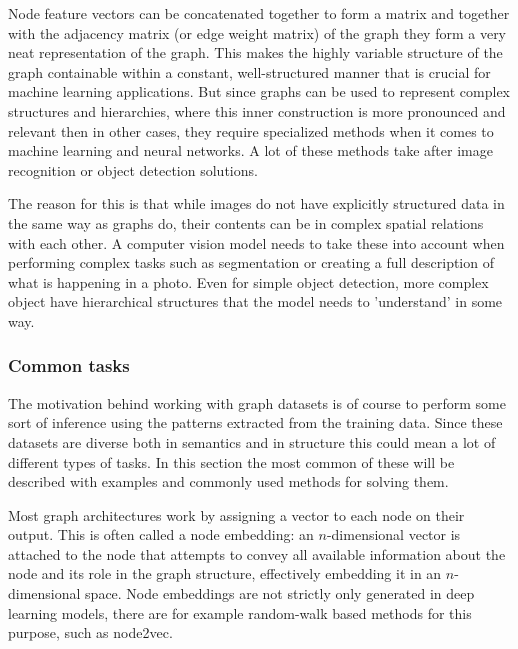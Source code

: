 	Node feature vectors can be concatenated together to form a matrix and together with the adjacency matrix (or edge weight matrix) of the graph they form a very neat representation of the graph. This makes the highly variable structure of the graph containable within a constant, well-structured manner that is crucial for machine learning applications. But since graphs can be used to represent complex structures and hierarchies, where this inner construction is more pronounced and relevant then in other cases, they require specialized methods when it comes to machine learning and neural networks. A lot of these methods take after image recognition or object detection solutions\cite{zhang2019graph}.
	
	The reason for this is that while images do not have explicitly structured data in the same way as graphs do, their contents can be in complex spatial relations with each other. A computer vision model needs to take these into account when performing complex tasks such as segmentation or creating a full description of what is happening in a photo. Even for simple object detection, more complex object have hierarchical structures that the model needs to 'understand' in some way.
	
		
	\subsubsection{Common tasks}
	\label{section:common_tasks}
	
	The motivation behind working with graph datasets is of course to perform some sort of inference using the patterns extracted from the training data. Since these datasets are diverse both in semantics and in structure this could mean a lot of different types of tasks. In this section the most common of these will be described with examples and commonly used methods for solving them.
	
	Most graph architectures work by assigning a vector to each node on their output. This is often called a node embedding: an $n$-dimensional vector is attached to the node that attempts to convey all available information about the node and its role in the graph structure, effectively embedding it in an $n$-dimensional space. Node embeddings are not strictly only generated in deep learning models, there are for example random-walk based methods for this purpose, such as node2vec\cite{grover2016node2vec}. 
	
